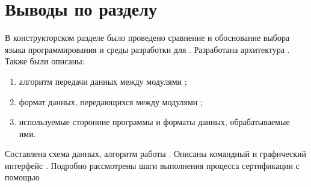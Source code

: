 \section*{Выводы по разделу}\label{sec:ch1/sec5}
В конструкторском разделе было проведено сравнение и обоснование выбора языка программирования
и среды разработки для {\ProgModule}.
Разработана архитектура {\ProgModule}.
Также были описаны:
\begin{enumerate}[label={\arabic*)}]
    \item алгоритм передачи данных между модулями {\ProgModule};
    \item формат данных, передающихся между модулями {\ProgModule};
    \item используемые сторонние программы и форматы данных, обрабатываемые ими.
\end{enumerate}
Составлена схема данных, алгоритм работы {\ProgModule}. Описаны командный и графический интерфейс {\ProgModule}.
Подробно рассмотрены шаги выполнения процесса сертификации с помощью {\ProgModule}
